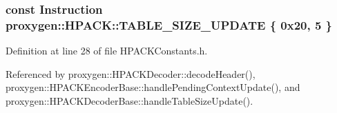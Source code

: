 \subsubsection[{T\+A\+B\+L\+E\+\_\+\+S\+I\+Z\+E\+\_\+\+U\+P\+D\+A\+TE}]{\setlength{\rightskip}{0pt plus 5cm}const {\bf Instruction} proxygen\+::\+H\+P\+A\+C\+K\+::\+T\+A\+B\+L\+E\+\_\+\+S\+I\+Z\+E\+\_\+\+U\+P\+D\+A\+TE \{ 0x20, 5 \}}\label{namespaceproxygen_1_1HPACK_af8823833e183ab790d309f7ad9a8b95e}


Definition at line 28 of file H\+P\+A\+C\+K\+Constants.\+h.



Referenced by proxygen\+::\+H\+P\+A\+C\+K\+Decoder\+::decode\+Header(), proxygen\+::\+H\+P\+A\+C\+K\+Encoder\+Base\+::handle\+Pending\+Context\+Update(), and proxygen\+::\+H\+P\+A\+C\+K\+Decoder\+Base\+::handle\+Table\+Size\+Update().

